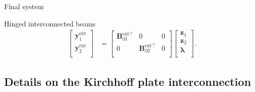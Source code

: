 \documentclass[aspectratio=169]{ISAE-Beamer}
\begin{document}
\begin{frame}{Final system}
\begin{block}{Hinged interconnected beams}
\begin{equation*}
\begin{aligned}
\begin{bmatrix}
\mathbf{y}_1^{\text{ext}} \\ \mathbf{y}_2^{\text{ext}} \\
\end{bmatrix}  &= \begin{bmatrix}
\mathbf{B}_{\partial 1}^{\text{ext} \top} & 0 & 0 \\
0 & \mathbf{B}_{\partial 2}^{\text{ext} \top} & 0 \\
\end{bmatrix} \begin{bmatrix}
\mathbf{z}_1  \\ 
\mathbf{z}_2  \\ 
\bm{\lambda} \\
\end{bmatrix}.
\end{aligned}
\end{equation*}
\end{block}
\end{frame}

\subsection{Details on the Kirchhoff plate interconnection}
\end{document}
